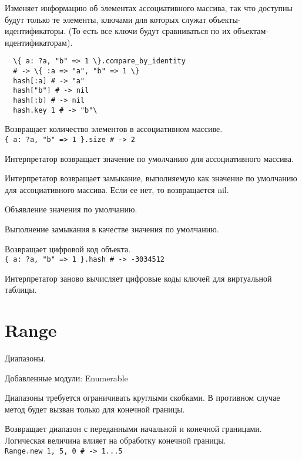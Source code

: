 \begin{methodlist}
  Изменяет информацию об элементах ассоциативного массива, так что доступны будут только те элементы, ключами для которых служат объекты-идентификаторы. (То есть все ключи будут сравниваться по их объектам-идентификаторам). 
  \begin{verbatim}
  \{ a: ?a, "b" => 1 \}.compare_by_identity
  # -> \{ :a => "a", "b" => 1 \} 
  hash[:a] # -> "a" 
  hash["b"] # -> nil
  hash[:b] # -> nil
  hash.key 1 # -> "b"\
  \end{verbatim}

  Возвращает количество элементов в ассоциативном массиве. 
  \\\verb!{ a: ?a, "b" => 1 }.size # -> 2!

  Интерпретатор возвращает значение по умолчанию для ассоциативного массива. 
 
  Интерпретатор возвращает замыкание, выполняемую как значение по умолчанию для ассоциативного массива. Если ее нет, то возвращается nil.

  Объявление значения по умолчанию. 
 
  Выполнение замыкания в качестве значения по умолчанию.

  Возвращает цифровой код объекта. 
  \\\verb!{ a: ?a, "b" => 1 }.hash # -> -3034512!
 
  Интерпретатор заново вычисляет цифровые коды ключей для виртуальной таблицы.
\end{methodlist}

\section{Range} 

Диапазоны.

Добавленные модули: Enumerable 

Диапазоны требуется ограничивать круглыми скобками. В противном случае метод будет вызван только для конечной границы.

\begin{methodlist}
  Возвращает диапазон с переданными начальной и конечной границами. Логическая величина влияет на обработку конечной границы.
  \\\verb!Range.new 1, 5, 0 # -> 1...5!
\end{methodlist}

